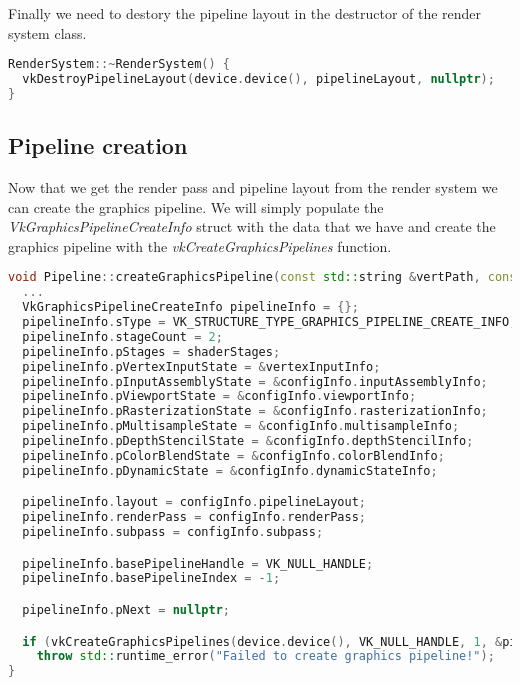 \documentclass[12pt]{report} \usepackage{preamble}
\begin{document}
Finally we need to destory the pipeline layout in the destructor of the render system class.

\begin{lstlisting}[language=C++]
RenderSystem::~RenderSystem() {
  vkDestroyPipelineLayout(device.device(), pipelineLayout, nullptr);
}
\end{lstlisting}

\subsection{Pipeline creation}

Now that we get the render pass and pipeline layout from the render system we can create the graphics pipeline.
We will simply populate the \textit{VkGraphicsPipelineCreateInfo} struct with the data that we have and create the
graphics pipeline with the \textit{vkCreateGraphicsPipelines} function.

\begin{lstlisting}[language=C++]
void Pipeline::createGraphicsPipeline(const std::string &vertPath, const std::string &fragPath, const PipelineConfigInfo &configInfo) {
  ...
  VkGraphicsPipelineCreateInfo pipelineInfo = {};
  pipelineInfo.sType = VK_STRUCTURE_TYPE_GRAPHICS_PIPELINE_CREATE_INFO;
  pipelineInfo.stageCount = 2;
  pipelineInfo.pStages = shaderStages;
  pipelineInfo.pVertexInputState = &vertexInputInfo;
  pipelineInfo.pInputAssemblyState = &configInfo.inputAssemblyInfo;
  pipelineInfo.pViewportState = &configInfo.viewportInfo;
  pipelineInfo.pRasterizationState = &configInfo.rasterizationInfo;
  pipelineInfo.pMultisampleState = &configInfo.multisampleInfo;
  pipelineInfo.pDepthStencilState = &configInfo.depthStencilInfo;
  pipelineInfo.pColorBlendState = &configInfo.colorBlendInfo;
  pipelineInfo.pDynamicState = &configInfo.dynamicStateInfo;

  pipelineInfo.layout = configInfo.pipelineLayout;
  pipelineInfo.renderPass = configInfo.renderPass;
  pipelineInfo.subpass = configInfo.subpass;

  pipelineInfo.basePipelineHandle = VK_NULL_HANDLE;
  pipelineInfo.basePipelineIndex = -1;

  pipelineInfo.pNext = nullptr;

  if (vkCreateGraphicsPipelines(device.device(), VK_NULL_HANDLE, 1, &pipelineInfo, nullptr, &graphicsPipeline) != VK_SUCCESS)
    throw std::runtime_error("Failed to create graphics pipeline!");
}
\end{lstlisting}
\end{document}
